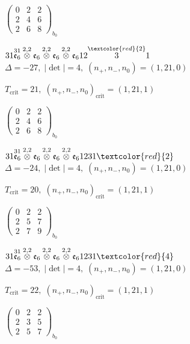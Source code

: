 \documentclass[10pt]{article}
\begin{document}
\hspace{2em}$\left(\begin{smallmatrix}0 & 2 & 2 \\ 2 & 4 & 6 \\ 2 & 6 & 8\end{smallmatrix}\right)_{\!b_0}$

\smallskip

$31\overset{31}{\mathfrak{e}_6}\overset{2,2}{\otimes}\mathfrak{e}_6\overset{2,2}{\otimes}\mathfrak{e}_6\overset{2,2}{\otimes}\mathfrak{e}_612\overset{\textcolor{red}{2}}{3}1$ \quad $\Delta=-27,\; |\det|=4,\; (n_+,n_-,n_0)=(1,21,0)$

\hspace{1em}$T_{\text{crit}}=21,\; (n_+,n_-,n_0)_{\text{crit}}=(1,21,1)$

\hspace{2em}$\left(\begin{smallmatrix}0 & 2 & 2 \\ 2 & 4 & 6 \\ 2 & 6 & 8\end{smallmatrix}\right)_{\!b_0}$

$31\overset{31}{\mathfrak{e}_6}\overset{2,2}{\otimes}\mathfrak{e}_6\overset{2,2}{\otimes}\mathfrak{e}_6\overset{2,2}{\otimes}\mathfrak{e}_61231\textcolor{red}{2}$ \quad $\Delta=-24,\; |\det|=4,\; (n_+,n_-,n_0)=(1,21,0)$

\hspace{1em}$T_{\text{crit}}=20,\; (n_+,n_-,n_0)_{\text{crit}}=(1,21,1)$

\hspace{2em}$\left(\begin{smallmatrix}0 & 2 & 2 \\ 2 & 5 & 7 \\ 2 & 7 & 9\end{smallmatrix}\right)_{\!b_0}$

$31\overset{31}{\mathfrak{e}_6}\overset{2,2}{\otimes}\mathfrak{e}_6\overset{2,2}{\otimes}\mathfrak{e}_6\overset{2,2}{\otimes}\mathfrak{e}_61231\textcolor{red}{4}$ \quad $\Delta=-53,\; |\det|=4,\; (n_+,n_-,n_0)=(1,21,0)$

\hspace{1em}$T_{\text{crit}}=22,\; (n_+,n_-,n_0)_{\text{crit}}=(1,21,1)$

\hspace{2em}$\left(\begin{smallmatrix}0 & 2 & 2 \\ 2 & 3 & 5 \\ 2 & 5 & 7\end{smallmatrix}\right)_{\!b_0}$
\end{document}
